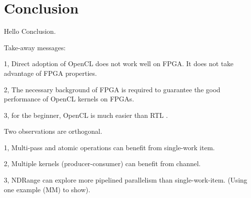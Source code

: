 \section{Conclusion}
Hello Conclusion. 

Take-away messages:

1, Direct adoption of OpenCL does not work well on FPGA. It does not take advantage of FPGA properties. 

2, The necessary background of FPGA is required to guarantee the good performance of OpenCL kernels on FPGAs. 

3, for the beginner, OpenCL is much easier than RTL . 

Two observations are orthogonal. 

1, Multi-pass and atomic operations can benefit from single-work item.

2, Multiple kernels (producer-consumer) can benefit from channel. 

3, NDRange can explore more pipelined parallelism than single-work-item. (Using one example (MM) to show).



